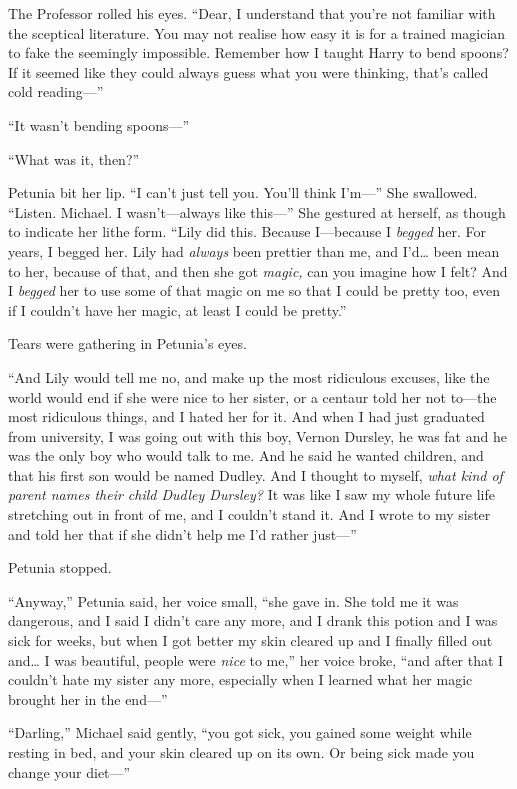 The Professor rolled his eyes. ``Dear, I understand that you're not
familiar with the sceptical literature. You may not realise how easy it
is for a trained magician to fake the seemingly impossible. Remember how
I taught Harry to bend spoons? If it seemed like they could always guess
what you were thinking, that's called cold reading---''

``It wasn't bending spoons---''

``What was it, then?''

Petunia bit her lip. ``I can't just tell you. You'll think I'm---'' She
swallowed. ``Listen. Michael. I wasn't---always like this---'' She
gestured at herself, as though to indicate her lithe form. ``Lily did
this. Because I---because I \emph{begged} her. For years, I begged her.
Lily had \emph{always} been prettier than me, and I'd\ldots{} been mean
to her, because of that, and then she got \emph{magic,} can you imagine
how I felt? And I \emph{begged} her to use some of that magic on me so
that I could be pretty too, even if I couldn't have her magic, at least
I could be pretty.''

Tears were gathering in Petunia's eyes.

``And Lily would tell me no, and make up the most ridiculous excuses,
like the world would end if she were nice to her sister, or a centaur
told her not to---the most ridiculous things, and I hated her for it.
And when I had just graduated from university, I was going out with this
boy, Vernon Dursley, he was fat and he was the only boy who would talk
to me. And he said he wanted children, and that his first son would be
named Dudley. And I thought to myself, \emph{what kind of parent names
their child Dudley Dursley?} It was like I saw my whole future life
stretching out in front of me, and I couldn't stand it. And I wrote to
my sister and told her that if she didn't help me I'd rather just---''

Petunia stopped.

``Anyway,'' Petunia said, her voice small, ``she gave in. She told me it
was dangerous, and I said I didn't care any more, and I drank this
potion and I was sick for weeks, but when I got better my skin cleared
up and I finally filled out and\ldots{} I was beautiful, people were
\emph{nice} to me,'' her voice broke, ``and after that I couldn't hate
my sister any more, especially when I learned what her magic brought her
in the end---''

``Darling,'' Michael said gently, ``you got sick, you gained some weight
while resting in bed, and your skin cleared up on its own. Or being sick
made you change your diet---''

